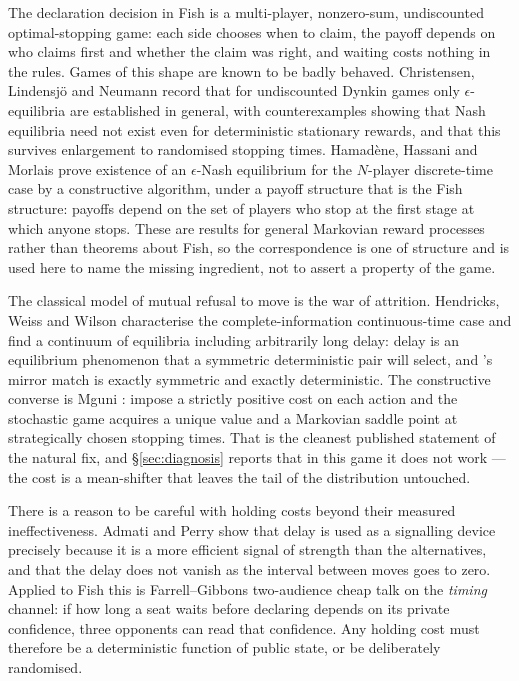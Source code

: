 The declaration decision in Fish is a multi-player, nonzero-sum, undiscounted
optimal-stopping game: each side chooses when to claim, the payoff depends on who
claims first and whether the claim was right, and waiting costs nothing in the
rules. Games of this shape are known to be badly behaved. Christensen,
Lindensj\"o and Neumann \cite{christensen-dynkin} record that for undiscounted
Dynkin games only $\epsilon$-equilibria are established in general, with
counterexamples showing that Nash equilibria need not exist even for
deterministic stationary rewards, and that this survives enlargement to
randomised stopping times. Hamad\`ene, Hassani and Morlais
\cite{hamadene-dynkin} prove existence of an $\epsilon$-Nash equilibrium for the
$N$-player discrete-time case by a constructive algorithm, under a payoff
structure that is the Fish structure: payoffs depend on the set of players who
stop at the first stage at which anyone stops. These are results for general
Markovian reward processes rather than theorems about Fish, so the correspondence
is one of structure and is used here to name the missing ingredient, not to
assert a property of the game.

The classical model of mutual refusal to move is the war of attrition. Hendricks,
Weiss and Wilson \cite{hendricks-attrition} characterise the complete-information
continuous-time case and find a continuum of equilibria including arbitrarily
long delay: delay is an equilibrium phenomenon that a symmetric deterministic
pair will select, and \vfour{}'s mirror match is exactly symmetric and exactly
deterministic. The constructive converse is Mguni \cite{mguni-actioncost}: impose
a strictly positive cost on each action and the stochastic game acquires a unique
value and a Markovian saddle point at strategically chosen stopping times. That
is the cleanest published statement of the natural fix, and \S\ref{sec:diagnosis}
reports that in this game it does not work --- the cost is a mean-shifter that
leaves the tail of the distribution untouched.

There is a reason to be careful with holding costs beyond their measured
ineffectiveness. Admati and Perry \cite{admati-perry} show that delay is used as
a signalling device precisely because it is a more efficient signal of strength
than the alternatives, and that the delay does not vanish as the interval between
moves goes to zero. Applied to Fish this is Farrell--Gibbons two-audience cheap
talk \cite{farrell-gibbons} on the \emph{timing} channel: if how long a seat
waits before declaring depends on its private confidence, three opponents can
read that confidence. Any holding cost must therefore be a deterministic function
of public state, or be deliberately randomised.


